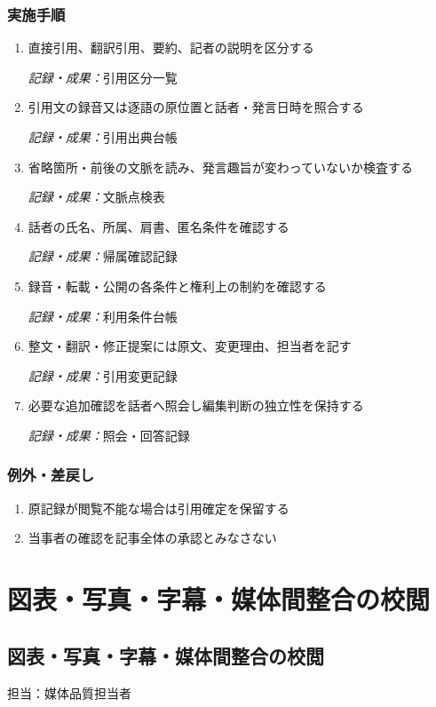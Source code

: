\documentclass[a4paper,11pt]{article}
\begin{document}
\subsubsection*{実施手順}
\begin{enumerate}[leftmargin=2em,itemsep=0.65em]
\item 直接引用、翻訳引用、要約、記者の説明を区分する\par\noindent\textit{記録・成果：}引用区分一覧\nobreak\smallskip
\item 引用文の録音又は逐語の原位置と話者・発言日時を照合する\par\noindent\textit{記録・成果：}引用出典台帳\nobreak\smallskip
\item 省略箇所・前後の文脈を読み、発言趣旨が変わっていないか検査する\par\noindent\textit{記録・成果：}文脈点検表\nobreak\smallskip
\item 話者の氏名、所属、肩書、匿名条件を確認する\par\noindent\textit{記録・成果：}帰属確認記録\nobreak\smallskip
\item 録音・転載・公開の各条件と権利上の制約を確認する\par\noindent\textit{記録・成果：}利用条件台帳\nobreak\smallskip
\item 整文・翻訳・修正提案には原文、変更理由、担当者を記す\par\noindent\textit{記録・成果：}引用変更記録\nobreak\smallskip
\item 必要な追加確認を話者へ照会し編集判断の独立性を保持する\par\noindent\textit{記録・成果：}照会・回答記録\nobreak\smallskip
\end{enumerate}
\subsubsection*{例外・差戻し}
\begin{enumerate}[leftmargin=2em,itemsep=0.35em]
\item 原記録が閲覧不能な場合は引用確定を保留する
\item 当事者の確認を記事全体の承認とみなさない
\end{enumerate}
\section{図表・写真・字幕・媒体間整合の校閲}
\subsection{図表・写真・字幕・媒体間整合の校閲}
\par 担当：媒体品質担当者\par\medskip
\end{document}
